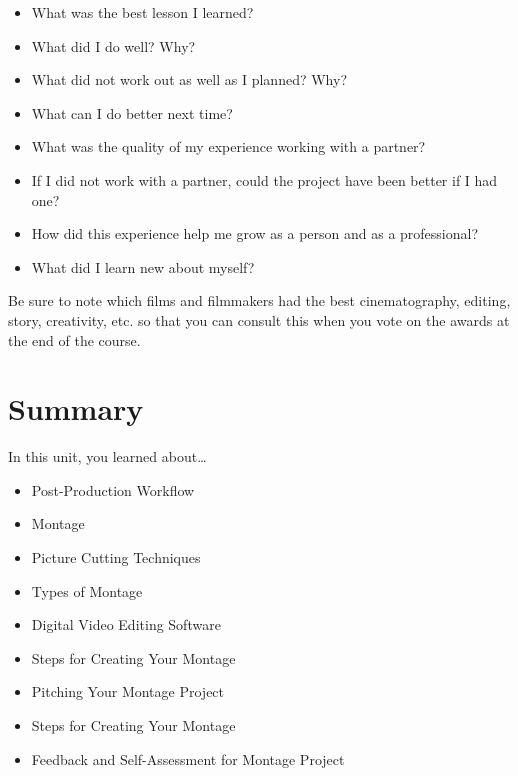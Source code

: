\documentclass[
]{book}
\providecommand{\tightlist}{%
  \setlength{\itemsep}{0pt}\setlength{\parskip}{0pt}}
\begin{document}
\begin{reflect}
\begin{itemize}
\tightlist
\item
  What was the best lesson I learned?\\
\item
  What did I do well? Why?\\
\item
  What did not work out as well as I planned? Why?\\
\item
  What can I do better next time?\\
\item
  What was the quality of my experience working with a partner?\\
\item
  If I did not work with a partner, could the project have been better if I had one?\\
\item
  How did this experience help me grow as a person and as a professional?\\
\item
  What did I learn new about myself?
\end{itemize}

Be sure to note which films and filmmakers had the best cinematography, editing, story, creativity, etc. so that you can consult this when you vote on the awards at the end of the course.
\end{reflect}

\hypertarget{summary-6}{%
\section*{Summary}\label{summary-6}}

In this unit, you learned about\ldots{}

\begin{itemize}
\tightlist
\item
  Post-Production Workflow\\
\item
  Montage\\
\item
  Picture Cutting Techniques\\
\item
  Types of Montage\\
\item
  Digital Video Editing Software\\
\item
  Steps for Creating Your Montage\\
\item
  Pitching Your Montage Project\\
\item
  Steps for Creating Your Montage\\
\item
  Feedback and Self-Assessment for Montage Project
\end{itemize}
\end{document}
